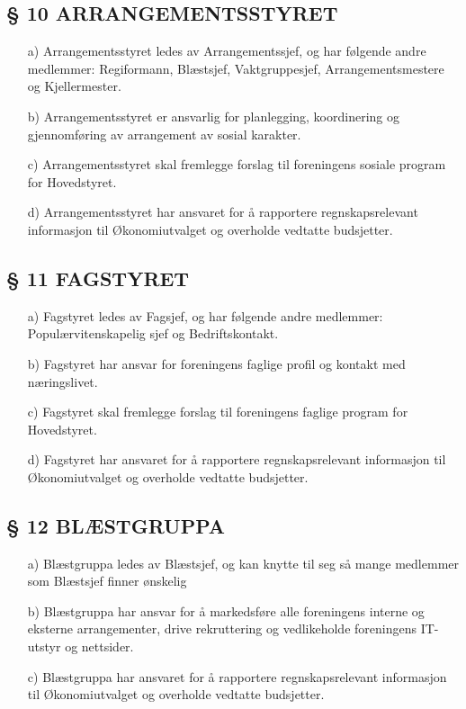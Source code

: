 \subsection*{§ 10 ARRANGEMENTSSTYRET}

\begin{itemize}
\item[a)] Arrangementsstyret ledes av Arrangementssjef, og har følgende andre
medlemmer: Regiformann, Blæstsjef, Vaktgruppesjef,
Arrangementsmestere og Kjellermester.

\item[b)] Arrangementsstyret er ansvarlig for planlegging, koordinering og 
gjennomføring av arrangement av sosial karakter. 

\item[c)] Arrangementsstyret skal fremlegge forslag til foreningens sosiale
program for Hovedstyret.

\item[d)] Arrangementsstyret har ansvaret for å rapportere regnskapsrelevant informasjon til Økonomiutvalget og overholde vedtatte budsjetter.
\end{itemize}


\subsection*{§ 11 FAGSTYRET}

\begin{itemize}
\item[a)] Fagstyret ledes av Fagsjef, og har følgende andre medlemmer:
Populærvitenskapelig sjef og Bedriftskontakt.

\item[b)] Fagstyret har ansvar for foreningens faglige profil og kontakt med
næringslivet.

\item[c)] Fagstyret skal fremlegge forslag til foreningens faglige program
for Hovedstyret.

\item[d)] Fagstyret har ansvaret for å rapportere regnskapsrelevant informasjon til Økonomiutvalget og overholde vedtatte budsjetter.
\end{itemize}


\subsection*{§ 12 BLÆSTGRUPPA}

\begin{itemize}
\item[a)] Blæstgruppa ledes av Blæstsjef, og kan knytte til seg så
  mange medlemmer som Blæstsjef finner ønskelig
 
\item[b)] Blæstgruppa har ansvar for å markedsføre alle foreningens
interne og eksterne arrangementer, drive rekruttering og vedlikeholde
foreningens IT-utstyr og nettsider.

\item[c)] Blæstgruppa har ansvaret for å rapportere regnskapsrelevant informasjon til Økonomiutvalget og overholde vedtatte budsjetter.
\end{itemize}


